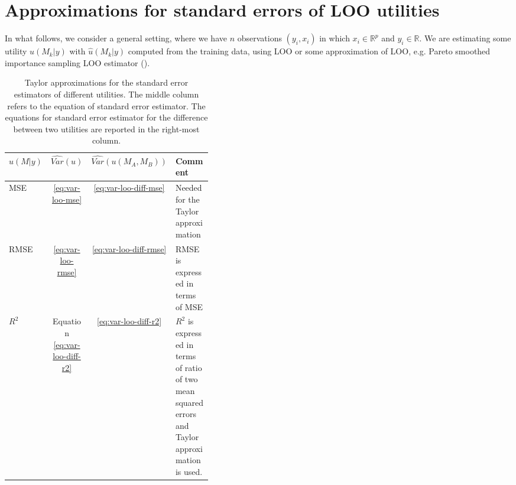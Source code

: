 \documentclass{article}
\begin{document}
\section{Approximations for standard errors of LOO utilities}
In what follows, we consider a general setting, where we have $n$ observations $(y_i, x_i)$ in which $x_i \in \mathbb{R}^p$ and $y_i \in \mathbb{R}$. We are estimating some utility $u(M_k | y)$ with $\hat{u}(M_k |y)$ computed from the training data, using LOO or some approximation of LOO, e.g. Pareto smoothed importance sampling LOO estimator (\cite{vehtari_practical_2016}).

\begin{table}[]
    \centering
    \begin{tabular}{l c c p{0.4\linewidth}}
    \toprule
    $u(M | y)$ & $\widehat{Var}(u)$  & $\widehat{Var}(u(M_A, M_B))$ & Comment \\ \midrule
    MSE & \eqref{eq:var-loo-mse} & \eqref{eq:var-loo-diff-mse} & Needed for the Taylor approximation\\
    RMSE  & \eqref{eq:var-loo-rmse} & \eqref{eq:var-loo-diff-rmse} & RMSE is expressed in terms of MSE\\
    $R^2$ & Equation \eqref{eq:var-loo-diff-r2} & \eqref{eq:var-loo-diff-r2} & $R^2$ is expressed in terms of ratio of two mean squared errors and Taylor approximation is used.
    \end{tabular}
    \caption{Taylor approximations for the standard error estimators of different utilities. The middle column refers to the equation of standard error estimator. The equations for standard error estimator for the difference between two utilities are reported in the right-most column.}
    \label{tbl:se-approximations}
\end{table}

\end{document}
